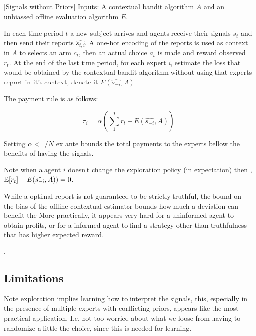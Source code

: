 \begin{mech}\label{mech:bandit}[Signals without Priors]
Inputs: A contextual bandit algorithm $A$ and an unbiassed offline evaluation algorithm $E$.

In each time period $t$ a new subject arrives and agents receive their signals $s_t$ and then send their reports $\hat{s_{t,i}}$. A one-hot encoding of the reports is used as context in $A$ to selects an arm $c_t$, then an actual choice $a_t$ is made and reward observed $r_t$.
At the end of the last time period, for each expert $i$, estimate the loss that would be obtained by the contextual bandit algorithm without using that experts report in it's context, denote it $E(\hat{s_{-i}},A)$
 
The payment rule is as follows:

\[
    \pi_i =  \alpha (\sum_1^T r_t -  E(\hat{s_{-i}},A))
\]

Setting $\alpha<1/N$ ex ante bounds the total payments to the experts bellow the benefits of having the signals.

\end{mech}


Note when a agent $i$ doesn't change the exploration policy (in expectation) then , $ \operatorname*{\mathbb E}[r_t] -  E(\hat{s_{-i}},A)) =0  $.

While a optimal report is not guaranteed to be strictly truthful, the bound on the bias of the offline contextual estimator bounds how much a deviation can benefit the 
More practically, it appears very hard for a uninformed agent to obtain profits, or for a informed agent to find a strategy other than truthfulness that has higher expected reward.

.




\subsection{Limitations}


Note exploration implies learning how to interpret the signals, this, especially in the presence of multiple experts with conflicting priors, appears like the most practical application. I.e. not too worried about what we loose from having to randomize a little the choice, since this is needed for learning. 



